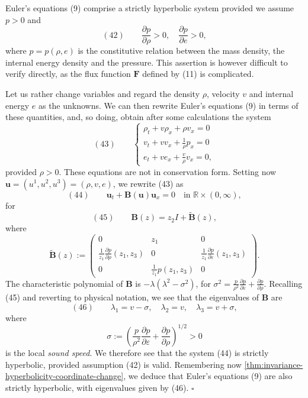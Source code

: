 \begin{example}
\label{ex:euler-equations-strict-hyperbolicity}
Euler's equations (9) comprise a strictly hyperbolic system provided we assume $p>0$ and
$$(42) \qquad \frac{\partial p}{\partial\rho}>0, \quad \frac{\partial p}{\partial e}>0,$$
where $p=p(\rho,e)$ is the constitutive relation between the mass density, the internal energy density and the pressure. This assertion is however difficult to verify directly, as the flux function $\mathbf{F}$ defined by (11) is complicated.

Let us rather change variables and regard the density $\rho$, velocity $v$ and internal energy $e$ as the unknowns. We can then rewrite Euler's equations (9) in terms of these quantities, and, so doing, obtain after some calculations the system
$$(43) \qquad \begin{cases} \rho_t + v\rho_x + \rho v_x = 0 \\ v_t + vv_x + \frac{1}{\rho}p_x = 0 \\ e_t + ve_x + \frac{v}{\rho}v_x = 0, \end{cases}$$
provided $\rho>0$. These equations are not in conservation form. Setting now $\mathbf{u}=(u^1,u^2,u^3)=(\rho,v,e)$, we rewrite (43) as
$$(44) \qquad \mathbf{u}_t + \mathbf{B}(\mathbf{u})\mathbf{u}_x = 0 \quad \text{in } \mathbb{R}\times(0,\infty),$$
for
$$(45) \qquad \mathbf{B}(z) = z_2 I + \tilde{\mathbf{B}}(z),$$
where
$$\tilde{\mathbf{B}}(z) := \begin{pmatrix} 0 & z_1 & 0 \\ \frac{1}{z_1}\frac{\partial p}{\partial\rho}(z_1,z_3) & 0 & \frac{1}{z_1}\frac{\partial p}{\partial\varepsilon}(z_1,z_3) \\ 0 & \frac{1}{z_1}p(z_1,z_3) & 0 \end{pmatrix}.$$
The characteristic polynomial of $\mathbf{B}$ is $-\lambda(\lambda^2-\sigma^2)$, for $\sigma^2 = \frac{p}{\rho^2}\frac{\partial p}{\partial\varepsilon} + \frac{\partial p}{\partial\rho}$. Recalling (45) and reverting to physical notation, we see that the eigenvalues of $\mathbf{B}$ are
$$(46) \qquad \lambda_1 = v-\sigma, \quad \lambda_2 = v, \quad \lambda_3 = v+\sigma,$$
where
$$\sigma := \left(\frac{p}{\rho^2}\frac{\partial p}{\partial\varepsilon} + \frac{\partial p}{\partial\rho}\right)^{1/2} > 0$$
is the local \textit{sound speed}. We therefore see that the system (44) is strictly hyperbolic, provided assumption (42) is valid. Remembering now \cref{thm:invariance-hyperbolicity-coordinate-change}, we deduce that Euler's equations (9) are also strictly hyperbolic, with eigenvalues given by (46). $\square$
\end{example}

